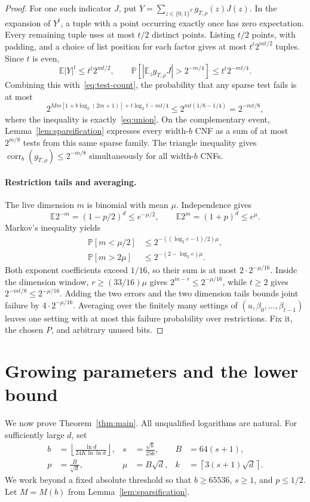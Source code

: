 \documentclass[11pt,letterpaper]{article}
\theoremstyle{definition}
\numberwithin{equation}{section}
\newcommand{\E}{\mathbb E}
\newcommand{\Prb}{\mathbb P}
\newcommand{\bits}{\{0,1\}}
\DeclareMathOperator{\corr}{corr}
\begin{document}
\begin{proof}
For one such indicator $J$, put $Y=\sum_{z\in\bits^T}g_{T,\rho}(z)J(z)$.
In the expansion of $Y^t$, a tuple with a point occurring exactly once has
zero expectation. Every remaining tuple uses at most $t/2$ distinct points.
Listing $t/2$ points, with padding, and a choice of list position for each
factor gives at most $t^t2^{mt/2}$ tuples. Since $t$ is even,
\[
 \E|Y|^t\le t^t2^{mt/2},\qquad
 \Prb[|\E_z g_{T,\rho}J|>2^{-m/4}]\le t^t2^{-mt/4}.
\]
Combining this with~\eqref{eq:test-count}, the probability that any sparse
test fails is at most
\[
 2^{Mm[1+b\log_2(2m+1)]+t\log_2t-mt/4}
 \le2^{mt(1/8-1/4)}=2^{-mt/8},
\]
where the inequality is exactly~\eqref{eq:union}. On the complementary
event, Lemma~\ref{lem:sparsification} expresses every width-$b$ CNF as a
sum of at most $2^{m/8}$ tests from this same sparse family. The triangle
inequality gives $\corr_b(g_{T,\rho})\le2^{-m/8}$ simultaneously for all
width-$b$ CNFs.

\paragraph{Restriction tails and averaging.}
The live dimension $m$ is binomial with mean $\mu$. Independence gives
\[
 \E2^{-m}=(1-p/2)^d\le e^{-\mu/2},\qquad
 \E2^m=(1+p)^d\le e^\mu.
\]
Markov's inequality yields
\begin{align*}
 \Prb[m<\mu/2]&\le2^{-((\log_2e-1)/2)\mu},\\
 \Prb[m>2\mu]&\le2^{-(2-\log_2e)\mu}.
\end{align*}
Both exponent coefficients exceed $1/16$, so their sum is at most
$2\cdot2^{-\mu/16}$. Inside the dimension window,
$r\ge(33/16)\mu$ gives $2^{m-r}\le2^{-\mu/16}$, while $t\ge2$ gives
$2^{-mt/8}\le2^{-\mu/16}$. Adding the two errors and the two dimension
tails bounds joint failure by $4\cdot2^{-\mu/16}$.
Averaging over the finitely many settings of $(u,\beta_0,\ldots,\beta_{t-1})$
leaves one setting with at most this failure probability over restrictions.
Fix it, the chosen $P$, and arbitrary unused bits.
\end{proof}

\section{Growing parameters and the lower bound}\label{sec:main-proof}


We now prove Theorem~\ref{thm:main}. All unqualified logarithms are natural.
For sufficiently large $d$, set
\begin{align*}
 b&=\left\lfloor\frac{\ln d}{24K\ln\ln d}\right\rfloor,&
 s&=\frac{\sqrt b}{256},& B&=64(s+1),\\
 p&=\frac{B}{\sqrt d},& \mu&=B\sqrt d,&
 k&=\left\lceil3(s+1)\sqrt d\right\rceil.
\end{align*}
We work beyond a fixed absolute threshold so that $b\ge65536$, $s\ge1$,
and $p\le1/2$. Let $M=M(b)$ from Lemma~\ref{lem:sparsification}.
\end{document}

